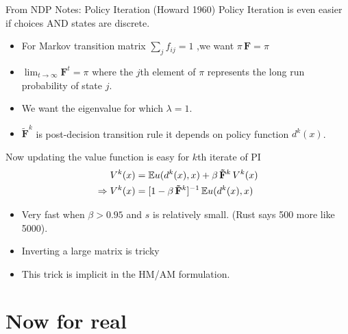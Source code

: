 \begin{frame}{From NDP Notes:  Policy Iteration (Howard 1960)}
\footnotesize
Policy Iteration is even easier if choices AND states are discrete.
\begin{itemize}
\item For Markov transition matrix $\sum_j f_{ij} =1$ ,we want $\pi \, \mathbf{F} = \pi$
\item $\lim_{t \rightarrow \infty} \mathbf{F}^t = \pi$ where the $j$th element of $\pi$ represents the long run probability of state $j$.
\item We want the eigenvalue for which $\lambda = 1$.
\item $\mathbf{\tilde{F}}^k$ is \alert{post-decision transition rule} it depends on \alert{policy function} $d^k(x)$.
\end{itemize}
Now updating the value function is easy for $k$th iterate of PI
\begin{align*}
V^k(x) &= \mathbb{E} u(d^k(x),x) + \beta \, \mathbf{\tilde{F}}^k \, V^k(x)\\
\Rightarrow V^k(x) &= [1 - \beta \, \mathbf{\tilde{F}}^k]^{-1}\, \mathbb{E} u(d^k(x),x)
\end{align*}
\vspace{-.5cm}
\begin{itemize}
\item Very fast when $\beta > 0.95$ and $s$ is relatively small. (Rust says 500 more like 5000).
\item Inverting a large matrix is tricky
\item \alert{This trick is implicit in the HM/AM formulation}.
\end{itemize}
\end{frame}


\section*{Now for real}


